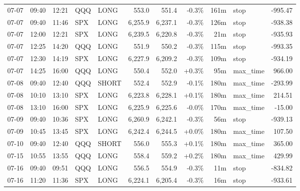 \documentclass[11pt,a4paper,twoside]{article}
\begin{document}
\begin{center}
\begin{longtable}{>{\color{txtmain}}l l l l l r r r r >{\color{txtmain}}l r}
07-07 & 09:40 & 12:21 & QQQ & LONG & 553.0 & 551.4 & \textcolor{lossred}{-0.3\%} & 161m & stop & \textcolor{lossred}{-995.47} \\
07-07 & 09:40 & 11:46 & SPX & LONG & 6,255.9 & 6,237.1 & \textcolor{lossred}{-0.3\%} & 126m & stop & \textcolor{lossred}{-938.38} \\
07-07 & 12:00 & 12:21 & SPX & LONG & 6,239.5 & 6,220.8 & \textcolor{lossred}{-0.3\%} & 21m & stop & \textcolor{lossred}{-935.93} \\
07-07 & 12:25 & 14:20 & QQQ & LONG & 551.9 & 550.2 & \textcolor{lossred}{-0.3\%} & 115m & stop & \textcolor{lossred}{-993.35} \\
07-07 & 12:30 & 14:19 & SPX & LONG & 6,227.9 & 6,209.2 & \textcolor{lossred}{-0.3\%} & 109m & stop & \textcolor{lossred}{-934.19} \\
07-07 & 14:25 & 16:00 & QQQ & LONG & 550.4 & 552.0 & \textcolor{wingreen}{+0.3\%} & 95m & max\_time & \textcolor{wingreen}{966.00} \\
07-08 & 09:40 & 12:40 & QQQ & SHORT & 552.4 & 552.9 & \textcolor{lossred}{-0.1\%} & 180m & max\_time & \textcolor{lossred}{-293.99} \\
07-08 & 10:10 & 13:10 & SPX & LONG & 6,223.8 & 6,228.1 & \textcolor{wingreen}{+0.1\%} & 180m & max\_time & \textcolor{wingreen}{214.51} \\
07-08 & 13:10 & 16:00 & SPX & LONG & 6,225.9 & 6,225.6 & \textcolor{lossred}{-0.0\%} & 170m & max\_time & \textcolor{lossred}{-15.00} \\
07-09 & 09:40 & 10:36 & SPX & LONG & 6,260.9 & 6,242.1 & \textcolor{lossred}{-0.3\%} & 56m & stop & \textcolor{lossred}{-939.13} \\
07-09 & 10:45 & 13:45 & SPX & LONG & 6,242.4 & 6,244.5 & \textcolor{wingreen}{+0.0\%} & 180m & max\_time & \textcolor{wingreen}{107.50} \\
07-10 & 09:40 & 12:40 & QQQ & SHORT & 556.0 & 555.3 & \textcolor{wingreen}{+0.1\%} & 180m & max\_time & \textcolor{wingreen}{365.00} \\
07-15 & 10:55 & 13:55 & QQQ & LONG & 558.4 & 559.2 & \textcolor{wingreen}{+0.2\%} & 180m & max\_time & \textcolor{wingreen}{429.99} \\
07-16 & 09:40 & 09:51 & QQQ & LONG & 556.5 & 554.9 & \textcolor{lossred}{-0.3\%} & 11m & stop & \textcolor{lossred}{-834.82} \\
07-16 & 11:20 & 11:36 & SPX & LONG & 6,224.1 & 6,205.4 & \textcolor{lossred}{-0.3\%} & 16m & stop & \textcolor{lossred}{-933.61} \\

\end{longtable}
\end{center}
\end{document}
